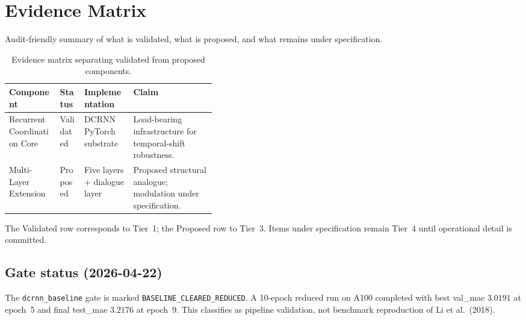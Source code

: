 \section{Evidence Matrix}
\label{sec:evidence-matrix}

Audit-friendly summary of what is validated, what is proposed, and what
remains under specification.

\begin{table}[h]
\centering
\small
\begin{tabular}{l l l p{0.40\linewidth}}
\toprule
\textbf{Component} & \textbf{Status} & \textbf{Implementation} & \textbf{Claim} \\
\midrule
Recurrent Coordination Core & Validated & DCRNN PyTorch substrate & Load-bearing infrastructure for temporal-shift robustness. \\
Multi-Layer Extension & Proposed & Five layers + dialogue layer & Proposed structural analogue; modulation under specification. \\
\bottomrule
\end{tabular}
\caption{Evidence matrix separating validated from proposed components.}
\label{tab:evidence-matrix}
\end{table}

The Validated row corresponds to Tier~1; the Proposed row to Tier~3.
Items under specification remain Tier~4 until operational detail is
committed.

\subsection*{Gate status (2026-04-22)}

The \texttt{dcrnn\_baseline} gate is marked
\texttt{BASELINE\_CLEARED\_REDUCED}. A 10-epoch reduced run on A100
completed with best val\_mae $3.0191$ at epoch~5 and final test\_mae
$3.2176$ at epoch~9. This classifies as pipeline validation, not
benchmark reproduction of Li et al.~(2018).
